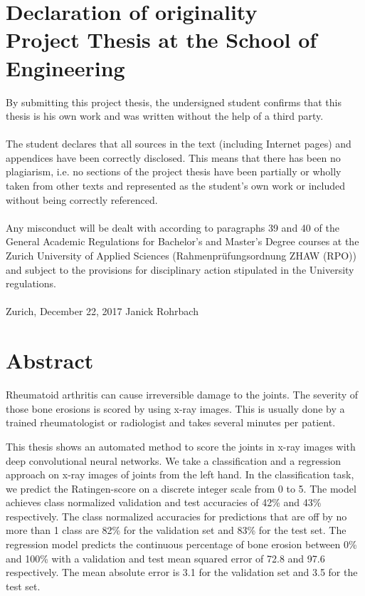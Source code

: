 \documentclass[12pt]{article}
\begin{document}
\section*{Declaration of originality\\ \large{Project Thesis at the School of Engineering}}
By submitting this project thesis, the undersigned student confirms that this thesis is his own work and was written without the help of a third party. \\
\\
The student declares that all sources in the text (including Internet pages) and appendices have been correctly disclosed. This means that there has been no plagiarism, i.e. no sections of the project thesis have been partially or wholly taken from other texts and represented as the student’s own work or included without being correctly referenced. \\
\\
Any misconduct will be dealt with according to paragraphs 39 and 40 of the General Academic Regulations for Bachelor’s and Master’s Degree courses at the Zurich University of Applied Sciences (Rahmenprüfungsordnung ZHAW (RPO)) and subject to the provisions for disciplinary action stipulated in the University regulations.\\
\vspace{3cm} \\
Zurich, December 22, 2017 \hspace{5cm} Janick Rohrbach

\newpage

\section*{Abstract}

Rheumatoid arthritis can cause irreversible damage to the joints. The severity of those bone erosions is scored by using x-ray images. This is usually done by a trained rheumatologist or radiologist and takes several minutes per patient.

This thesis shows an automated method to score the joints in x-ray images with deep convolutional neural networks. We take a classification and a regression approach on x-ray images of joints from the left hand. In the classification task, we predict the Ratingen-score on a discrete integer scale from 0 to 5. The model achieves class normalized validation and test accuracies of 42\% and 43\% respectively. The class normalized accuracies for predictions that are off by no more than 1 class are 82\% for the validation set and 83\% for the test set. The regression model predicts the continuous percentage of bone erosion between 0\% and 100\% with a validation and test mean squared error of 72.8 and 97.6 respectively. The mean absolute error is 3.1 for the validation set and 3.5 for the test set.
\end{document}
